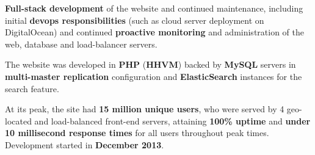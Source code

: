 \documentclass[11pt,a4paper,sans]{moderncv}
\begin{document}
		\textbf{Full-stack development} of the website and continued maintenance, including initial \textbf{devops responsibilities} (such as cloud server deployment on DigitalOcean) and continued \textbf{proactive monitoring} and administration of the web, database and load-balancer servers.

		The website was developed in \textbf{PHP} (\textbf{HHVM}) backed by \textbf{MySQL} servers in \textbf{multi-master replication} configuration and \textbf{ElasticSearch} instances for the search feature.

		At its peak, the site had \textbf{15 million unique users}, who were served by 4 geo-located and load-balanced front-end servers, attaining \textbf{100\% uptime} and \textbf{under 10 millisecond response times} for all users throughout peak times. Development started in \textbf{December 2013}.
\end{document}
